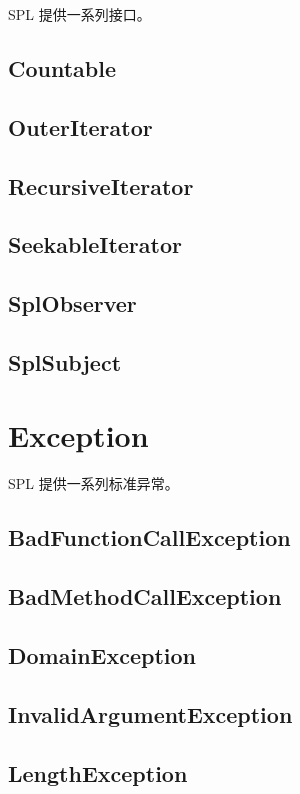 SPL 提供一系列接口。


\section{Countable}



\section{OuterIterator}



\section{RecursiveIterator}


\section{SeekableIterator}



\section{SplObserver}


\section{SplSubject}

\chapter{Exception}


SPL 提供一系列标准异常。

\section{BadFunctionCallException}
\section{BadMethodCallException}
\section{DomainException}
\section{InvalidArgumentException}
\section{LengthException}
